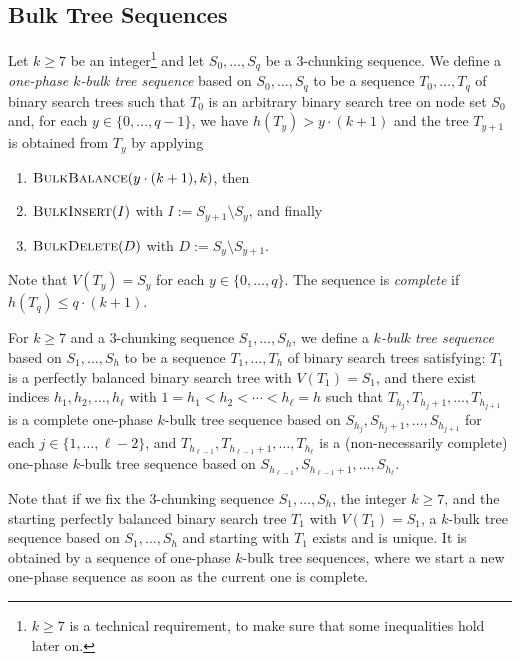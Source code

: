 \documentclass[kpfonts]{patmorin}
\let\ge\geqslant
\let\leq\leqslant
\let\geq\geqslant
\begin{document}
\subsection{Bulk Tree Sequences}



Let $k\ge 7$ be an integer\footnote{$k \geq 7$ is a technical requirement, to make sure that some inequalities hold later on.} and let $S_0,\dots,S_q$ be a $3$-chunking sequence.
We define a \emph{one-phase $k$-bulk tree sequence} based on $S_0,\dots,S_q$ to be a sequence $T_0, \dots, T_{q}$ of binary search trees such that $T_0$ is an arbitrary binary search tree on node set $S_0$ and,  for each $y\in \{0, \dots, q-1\}$, we have $h(T_y)>y\cdot(k+1)$ and
the tree $T_{y+1}$ is obtained from $T_y$ by applying
\begin{enumerate}[label={(\roman*)}, ref={\roman*}, noitemsep]
    \item $\textsc{BulkBalance}(y\cdot(k+1),k)$, then
    \item $\textsc{BulkInsert}(I)$ with $I:=S_{y+1} \setminus S_{y}$, and finally
    \item $\textsc{BulkDelete}(D)$ with $D:=S_{y} \setminus S_{y+1}$.
\end{enumerate}
Note that $V(T_y)=S_y$ for each $y \in \{0, \dots, q\}$.
The sequence is \emph{complete} if $h(T_q)\leq q\cdot(k+1)$.

For $k\geq 7$ and a $3$-chunking sequence $S_1,\dots,S_h$, we define
a \emph{$k$-bulk tree sequence} based on $S_1,\dots,S_h$ to be a sequence $T_1, \dots, T_h$ of binary search trees satisfying:
$T_1$ is a perfectly balanced binary search tree with $V(T_1)=S_1$, and
there exist indices $h_1,h_2,\dots,h_{\ell}$ with $1=h_1 < h_2 < \cdots <h_{\ell} = h$  such that $T_{h_j}, T_{h_j+1},\dots,T_{h_{j+1}}$ is a complete one-phase $k$-bulk tree sequence based on $S_{h_j}, S_{h_j+1},\dots,S_{h_{j+1}}$
for each $j\in\{1,\dots,\ell-2\}$, and $T_{h_{\ell-1}}, T_{h_{\ell-1}+1},\dots,T_{h_{\ell}}$ is a (non-necessarily complete) one-phase $k$-bulk tree sequence based on $S_{h_{\ell-1}},S_{h_{\ell-1}+1},\dots,S_{h_{\ell}}$.

Note that if we fix the $3$-chunking sequence $S_1,\dots,S_h$, the integer $k\ge 7$, and the starting perfectly balanced binary search tree $T_1$ with $V(T_1)=S_1$, a $k$-bulk tree sequence based on $S_1,\dots,S_h$ and starting with $T_1$ exists and is unique. It is obtained by a sequence of one-phase $k$-bulk tree sequences, where we start a new one-phase sequence as soon as the current one is complete.
\end{document}
